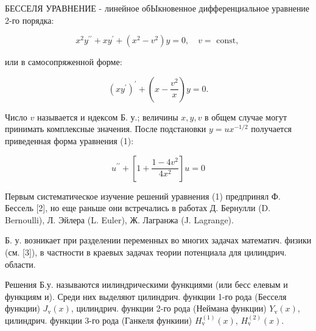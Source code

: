 \documentclass[10pt]{article}
\begin{document}
БЕССЕЛЯ УРАВНЕНИЕ - линейное обЫкновенное дифференциальное уравнение 2-го порядка:



\[

x^{2} y^{\prime \prime}+x y^{\prime}+\left(x^{2}-v^{2}\right) y=0, \quad v=\text { const, }

\]



или в самосопряженной форме:



\[

\left(x y^{\prime}\right)^{\prime}+\left(x-\frac{v^{2}}{x}\right) y=0 .

\]



Число $v$ называется и ндексом Б. у.; величины $x, y, v$ в общем случае могут принимать комплексные значения. После подстановки $y=u x^{-1 / 2}$ получается приведенная форма уравнения (1):



\[

u^{\prime \prime}+\left[1+\frac{1-4 v^{2}}{4 x^{2}}\right] u=0

\]



Первым систематическое изучение решений уравнения (1) предпринял Ф. Бессель [2], но еще раньше они встречались в работах Д. Бернулли (D. Bernoulli), Л. Эйлера (L. Euler), Ж. Лагранжа (J. Lagrange).



Б. у. возникает при разделении переменных во многих задачах математич. физики (см. [3]), в частности в краевых задачах теории потенциала для цилиндрич. области.



Решения Б.у. называются иилиндрическими функциями (или бесс елевым и функциям и). Среди них выделяют цилиндрич. функции 1-го рода (Бесселя функции) $J_{\mathrm{v}}(x)$, цилиндрич. функции 2-го рода (Неймана функции) $Y_{\mathrm{v}}(x)$, цилиндрич. функции 3-го рода (Ганкеля функиии) $H_{\mathrm{v}}^{(1)}(x)$, $H_{\mathrm{v}}^{(2)}(x)$.
\end{document}
